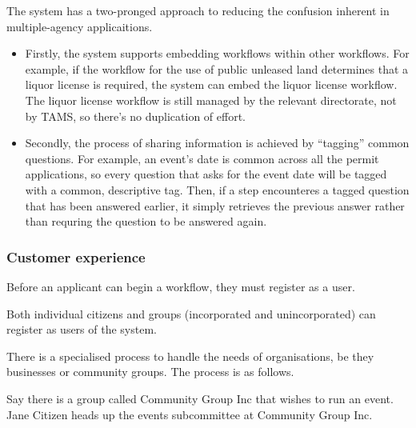 \documentclass[12pt,a4paper,twosided]{article}
\begin{document}
The system has a two-pronged approach to reducing the confusion inherent in multiple-agency applicaitions.
\begin{itemize}
\item Firstly, the system supports embedding workflows within other workflows. For example, if the workflow for the use of public unleased land determines that a liquor license is required, the system can embed the liquor license workflow. The liquor license workflow is still managed by the relevant directorate, not by TAMS, so there's no duplication of effort.

\item Secondly, the process of sharing information is achieved by ``tagging'' common questions. For example, an event's date is common across all the permit applications, so every question that asks for the event date will be tagged with a common, descriptive tag. Then, if a step encounteres a tagged question that has been answered earlier, it simply retrieves the previous answer rather than requring the question to be answered again.
\end{itemize}

\subsubsection{Customer experience}

Before an applicant can begin a workflow, they must register as a user.

Both individual citizens and groups (incorporated and unincorporated)
can register as users of the system.

There is a specialised process to handle the needs of organisations, be they businesses or community groups. The process is as follows.

Say there is a group called Community Group Inc that wishes to run an event. Jane Citizen heads up the events subcommittee at Community Group Inc.
\end{document}
